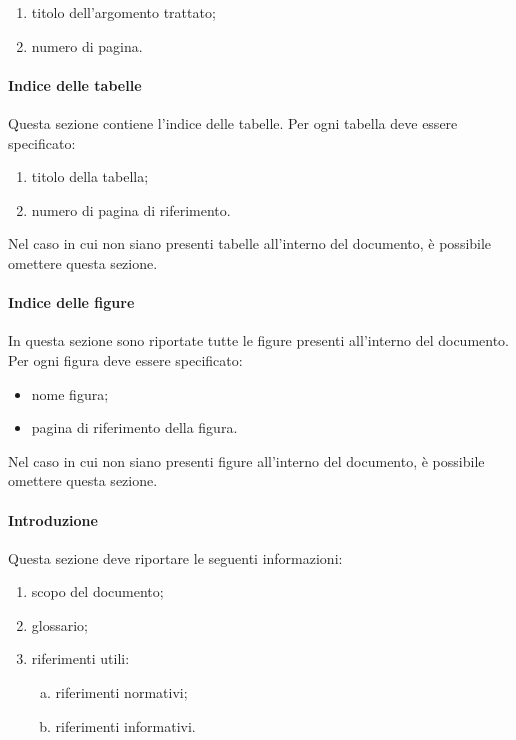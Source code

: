 \documentclass[../NormeProgetto.text]{subfiles}
\begin{document}
			\begin{enumerate}
				\item titolo dell'argomento trattato;
				\item numero di pagina.
			\end{enumerate}

		\paragraph{Indice delle tabelle}
			Questa sezione contiene l'indice delle tabelle. Per ogni tabella deve essere specificato:

			\begin{enumerate}
				\item titolo della tabella;
				\item numero di pagina di riferimento.
			\end{enumerate}

			Nel caso in cui non siano presenti tabelle all'interno del documento, è possibile omettere questa sezione.

		\paragraph{Indice delle figure}
			In questa sezione sono riportate tutte le figure presenti all'interno del documento. Per ogni figura deve essere specificato:
			\begin{itemize}
				\item nome figura;
				\item pagina di riferimento della figura.
			\end{itemize}
			Nel caso in cui non siano presenti figure all'interno del documento, è possibile omettere questa sezione.

		\paragraph{Introduzione}
			Questa sezione deve riportare le seguenti informazioni:
			\begin{enumerate}
				\item scopo del documento;
				\item glossario;
				\item riferimenti utili:
				\begin{enumerate}[a.]
					\item riferimenti normativi;
					\item riferimenti informativi.
				\end{enumerate}
			\end{enumerate}
\end{document}
